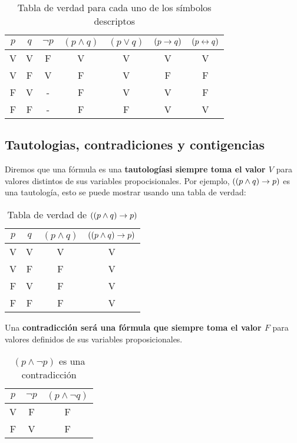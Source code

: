 \begin{table}[h]
	\begin{center}
		\begin{tabular}{c|c|c|c|c|c|c}
			$p$ & $q$ & $\lnot p$ & $(p \land q)$ & $(p \lor q)$ & $(p \rightarrow q)$ & $(p \leftrightarrow q)$  \\
			\hline
			V & V & F & V & V & V & V\\
			V & F & V & F & V & F & F\\
			F & V & - & F& V & V & F \\
			F & F & - & F & F & V & V\\
		\end{tabular}
	\end{center}
	\caption{Tabla de verdad para cada uno de los símbolos descriptos} 
\end{table}

\subsection{Tautologias, contradiciones y contigencias}

Diremos que una fórmula es una \textbf{tautologíasi siempre toma el valor $V$} para valores distintos de sus variables propocisionales. Por ejemplo, $((p\land q) \rightarrow p)$ es una tautología, esto se puede mostrar usando una tabla de verdad:

\begin{table}[h]\label{table::PyQImpliesP}
	\begin{center}
		\begin{tabular}{c|c|c|c}
			$p$ & $q$ & $(p\land q)$ & $((p \land q)\rightarrow p)$ \\
			\hline
			V & V & V & V \\
			V & F & F & V \\
			F & V & F & V \\
			F & F & F & V \\
		\end{tabular}
	\end{center}
	\caption{Tabla de verdad de  $((p\land q)\rightarrow p)$} 
\end{table}

Una \textbf{contradicción será una fórmula que siempre toma el valor $F$} para valores definidos de sus variables proposicionales.

\begin{table}[h]
	\begin{center}
		\begin{tabular}{c|c|c}
			$p$ & $\lnot p$ & $(p\land \lnot q)$ \\
			\hline
			V & F & F \\
			F & V & F \\
		\end{tabular}
	\end{center}
	\caption{$(p\land \lnot p)$ es una contradicción} 
\end{table} 

